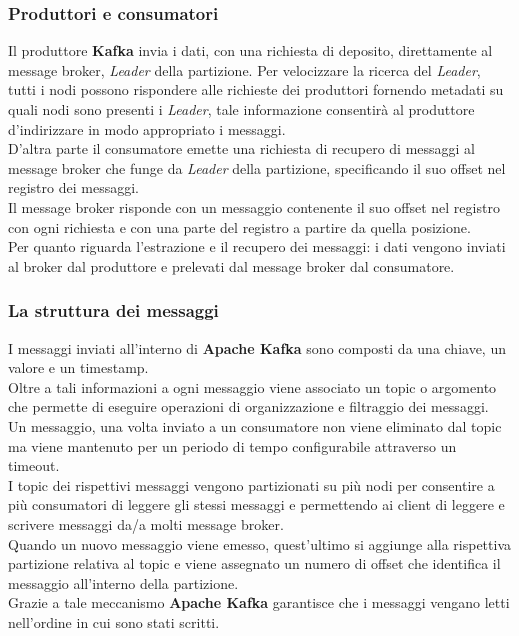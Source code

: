 \subsubsection{Produttori e consumatori}
Il produttore \textbf{Kafka} invia i dati, con una richiesta di deposito,  direttamente al \gls{message broker}{}, \textit{Leader} della partizione. Per velocizzare la ricerca del
\textit{Leader}, tutti i nodi possono rispondere alle richieste dei produttori fornendo \gls{metadati}{} su quali nodi sono presenti i \textit{Leader}, tale informazione consentirà al produttore d'indirizzare in modo
appropriato i messaggi.\\
D'altra parte il consumatore emette una richiesta di recupero di messaggi al \gls{message broker}{} che funge da \textit{Leader} della partizione, specificando il suo offset nel registro dei messaggi.\\
Il \gls{message broker}{} risponde con un messaggio contenente il suo offset nel registro con ogni richiesta e con una parte del registro a partire da quella posizione. \\
Per quanto riguarda l'estrazione e il recupero dei messaggi: i dati vengono inviati al broker dal produttore e prelevati dal \gls{message broker}{} dal consumatore. 
\subsubsection{La struttura dei messaggi}
I messaggi inviati all'interno di \textbf{Apache Kafka} sono composti da una chiave, un valore e un timestamp. \\
Oltre a tali informazioni a ogni messaggio viene associato un \gls{topic}{} o argomento che permette di eseguire operazioni di organizzazione 
e filtraggio dei messaggi.\\
Un messaggio, una volta inviato a un consumatore non viene eliminato dal \gls{topic}{} ma viene mantenuto per un periodo di tempo configurabile attraverso un timeout.\\
I \gls{topic}{} dei rispettivi messaggi vengono partizionati su più nodi per consentire a più consumatori di leggere gli stessi messaggi e permettendo ai client di leggere e scrivere messaggi da/a molti \gls{message broker}{}.\\
Quando un nuovo messaggio viene emesso, quest'ultimo si aggiunge alla rispettiva partizione relativa al \gls{topic}{} e viene assegnato un numero di offset che identifica il messaggio all'interno della partizione.\\
Grazie a tale meccanismo \textbf{Apache Kafka} garantisce che i messaggi vengano letti nell'ordine in cui sono stati scritti.
